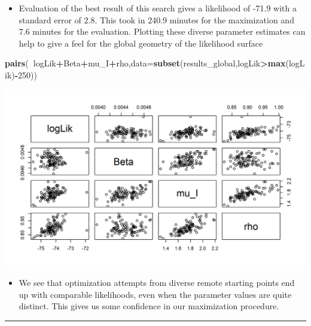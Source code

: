 \documentclass[]{article}
\newenvironment{Shaded}{\begin{snugshade}}{\end{snugshade}}
\newcommand{\KeywordTok}[1]{\textcolor[rgb]{0.13,0.29,0.53}{\textbf{#1}}}
\newcommand{\DataTypeTok}[1]{\textcolor[rgb]{0.13,0.29,0.53}{#1}}
\newcommand{\DecValTok}[1]{\textcolor[rgb]{0.00,0.00,0.81}{#1}}
\newcommand{\OperatorTok}[1]{\textcolor[rgb]{0.81,0.36,0.00}{\textbf{#1}}}
\newcommand{\NormalTok}[1]{#1}
\providecommand{\tightlist}{%
  \setlength{\itemsep}{0pt}\setlength{\parskip}{0pt}}
\begin{document}
\begin{itemize}
\tightlist
\item
  Evaluation of the best result of this search gives a likelihood of
  -71.9 with a standard error of 2.8. This took in 240.9 minutes for the
  maximization and 7.6 minutes for the evaluation. Plotting these
  diverse parameter estimates can help to give a feel for the global
  geometry of the likelihood surface
\end{itemize}

\begin{Shaded}
\begin{Highlighting}[]
\KeywordTok{pairs}\NormalTok{(}\OperatorTok{~}\NormalTok{logLik}\OperatorTok{+}\NormalTok{Beta}\OperatorTok{+}\NormalTok{mu_I}\OperatorTok{+}\NormalTok{rho,}\DataTypeTok{data=}\KeywordTok{subset}\NormalTok{(results_global,logLik}\OperatorTok{>}\KeywordTok{max}\NormalTok{(logLik)}\OperatorTok{-}\DecValTok{250}\NormalTok{))}
\end{Highlighting}
\end{Shaded}

\begin{center}\includegraphics{figure/notes12-pairs_global-1} \end{center}

\begin{itemize}
\tightlist
\item
  We see that optimization attempts from diverse remote starting points
  end up with comparable likelihoods, even when the parameter values are
  quite distinct. This gives us some confidence in our maximization
  procedure.
\end{itemize}

\begin{center}\rule{0.5\linewidth}{\linethickness}\end{center}
\end{document}
